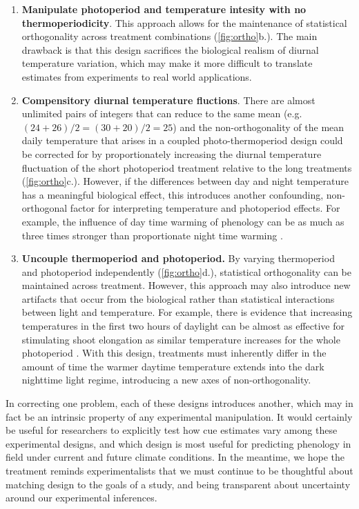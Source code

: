 \documentclass[11pt]{article}
\begin{document}
{\begin{enumerate}
\item \textbf{Manipulate photoperiod and temperature intesity with no thermoperiodicity}. This approach allows for the maintenance of statistical orthogonality across treatment combinations (\ref{fig:ortho}b.). The main drawback is that this design sacrifices the biological realism of diurnal temperature variation, which may make it more difficult to translate estimates from experiments to real world applications.

\item \textbf{Compensitory diurnal temperature fluctions}. There are almost unlimited pairs of integers that can reduce to the same mean (e.g. $(24+26)/2 = (30+20)/2 = 25$) and the non-orthogonality of the mean daily temperature that arises in a coupled photo-thermoperiod design could be corrected for by proportionately increasing the diurnal temperature fluctuation of the short photoperiod treatment relative to the long treatments (\ref{fig:ortho}c.). However, if the differences between day and night temperature has a meaningful biological effect, this introduces another confounding, non-orthogonal factor for interpreting temperature and photoperiod effects. For example, the influence of day time warming of phenology can be as much as three times stronger than proportionate night time warming \citep{Rossi2017,Meng:2020ui}.

\item \textbf{Uncouple thermoperiod and photoperiod.} By varying thermoperiod and photoperiod independently (\ref{fig:ortho}d.), statistical orthogonality can be maintained across treatment. However, this approach may also introduce new artifacts that occur from the biological rather than statistical interactions between light and temperature. For example, there is evidence that increasing temperatures in the first two hours of daylight can be almost as effective for stimulating shoot elongation as similar temperature increases for the whole photoperiod \citep{Erwin1998}. With this design, treatments must inherently differ in the amount of time the warmer daytime temperature extends into the dark nighttime light regime, introducing a new axes of non-orthogonality.
\end{enumerate}

In correcting one problem, each of these designs introduces another, which may in fact be an intrinsic property of any experimental manipulation. It would certainly be useful for researchers to explicitly test how cue estimates vary among these experimental designs, and which design is most useful for predicting phenology in field under current and future climate conditions. In the meantime, we hope the treatment reminds experimentalists that we must continue to be thoughtful about matching design to the goals of a study, and being transparent about uncertainty around our experimental inferences.




}
\end{document}
